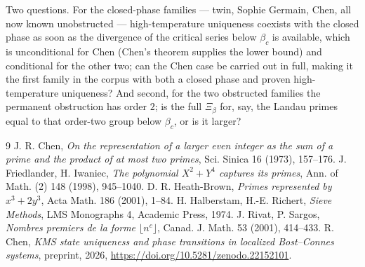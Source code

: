 \documentclass[11pt]{amsart}
\numberwithin{equation}{section}
\theoremstyle{definition}
\theoremstyle{remark}
\begin{document}
Two questions. For the closed-phase families --- twin, Sophie Germain, Chen, all now known
unobstructed --- high-temperature uniqueness coexists with the closed phase as soon as the
divergence of the critical series below $\beta_c$ is available, which is unconditional for
Chen (Chen's theorem \cite{Chen} supplies the lower bound) and conditional for the other
two; can the Chen case be carried out in full, making it the first family in the corpus with
both a closed phase and proven high-temperature uniqueness? And second, for the two
obstructed families the permanent obstruction has order $2$; is the full $\Xi_\beta$ for,
say, the Landau primes equal to that order-two group below $\beta_c$, or is it larger?

\begin{thebibliography}{9}
 J. R. Chen, \emph{On the representation of a larger even integer as the sum of a prime and the product of at most two primes}, Sci. Sinica 16 (1973), 157--176.
 J. Friedlander, H. Iwaniec, \emph{The polynomial $X^2+Y^4$ captures its primes}, Ann. of Math. (2) 148 (1998), 945--1040.
 D. R. Heath-Brown, \emph{Primes represented by $x^3+2y^3$}, Acta Math. 186 (2001), 1--84.
 H. Halberstam, H.-E. Richert, \emph{Sieve Methods}, LMS Monographs 4, Academic Press, 1974.
 J. Rivat, P. Sargos, \emph{Nombres premiers de la forme $\lfloor n^c\rfloor$}, Canad. J. Math. 53 (2001), 414--433.
 R. Chen, \emph{KMS state uniqueness and phase transitions in localized Bost--Connes systems}, preprint, 2026, \newline\url{https://doi.org/10.5281/zenodo.22152101}.
\end{thebibliography}
\end{document}
